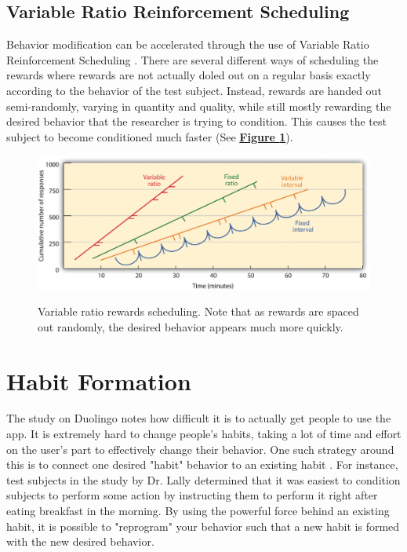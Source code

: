 \par 


\subsection{Variable Ratio Reinforcement Scheduling}
 Behavior modification can be accelerated through the use of Variable Ratio Reinforcement Scheduling \cite{ferster1957schedules} \cite{hardy_heyes_1999}. There are several different ways of scheduling the rewards  where rewards are not actually doled out on a regular basis exactly according to the behavior of the test subject. Instead, rewards are handed out semi-randomly, varying in quantity and quality, while still mostly rewarding the desired behavior that the researcher is trying to condition. This causes the test subject to become conditioned much faster (See \textbf{\hyperref[fig:variable_ratio]{Figure \ref*{fig:variable_ratio}}}).
 
 \begin{figure}[h]
 	\includegraphics[width=1.0\linewidth]{figures/variable_ratio}
 	\caption{Variable ratio rewards scheduling. Note that as rewards are spaced out randomly, the desired behavior appears much more quickly.}
 	\label{fig:variable_ratio}
 	\cite{hardy_heyes_1999}
 \end{figure}

\section{Habit Formation}



The study on Duolingo notes how difficult it is to actually get people to use the app. It is extremely hard to change people's habits, taking a lot of time and effort on the user's part to effectively change their behavior. One such strategy around this is to connect one desired "habit" behavior to an existing habit \cite{lally2010habits}. For instance, test subjects in the study by Dr. Lally determined that it was easiest to condition subjects to perform some action by instructing them to perform it right after eating breakfast in the morning. By using the powerful force behind an existing habit, it is possible to "reprogram" your behavior such that a new habit is formed with the new desired behavior.


